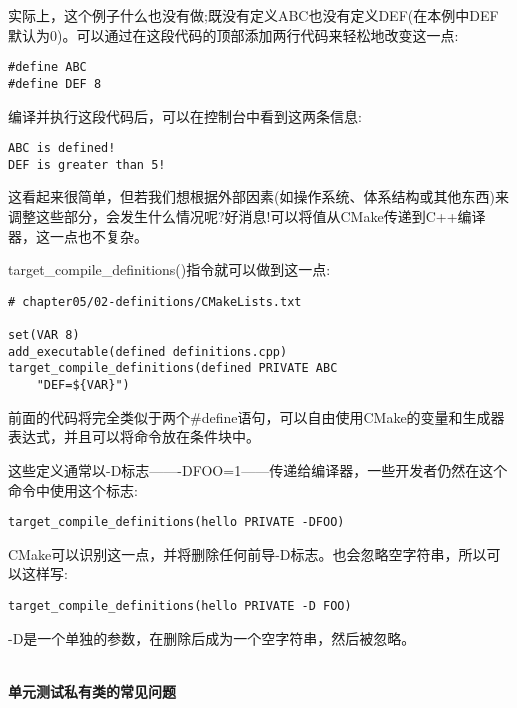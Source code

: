 实际上，这个例子什么也没有做;既没有定义ABC也没有定义DEF(在本例中DEF默认为0)。可以通过在这段代码的顶部添加两行代码来轻松地改变这一点:

\begin{lstlisting}[style=styleCXX]
#define ABC
#define DEF 8
\end{lstlisting}

编译并执行这段代码后，可以在控制台中看到这两条信息:

\begin{lstlisting}[style=styleCXX]
ABC is defined!
DEF is greater than 5!
\end{lstlisting}

这看起来很简单，但若我们想根据外部因素(如操作系统、体系结构或其他东西)来调整这些部分，会发生什么情况呢?好消息!可以将值从CMake传递到C++编译器，这一点也不复杂。

target\_compile\_definitions()指令就可以做到这一点:

\begin{lstlisting}[style=styleCMake]
# chapter05/02-definitions/CMakeLists.txt

set(VAR 8)
add_executable(defined definitions.cpp)
target_compile_definitions(defined PRIVATE ABC
	"DEF=${VAR}")
\end{lstlisting}

前面的代码将完全类似于两个\#define语句，可以自由使用CMake的变量和生成器表达式，并且可以将命令放在条件块中。

\begin{tcolorbox}[colback=blue!5!white,colframe=blue!75!black,title=重要的Note]
这些定义通常以-D标志——-DFOO=1——传递给编译器，一些开发者仍然在这个命令中使用这个标志:

\begin{lstlisting}[style=styleCMake]
target_compile_definitions(hello PRIVATE -DFOO)
\end{lstlisting}  

CMake可以识别这一点，并将删除任何前导-D标志。也会忽略空字符串，所以可以这样写:

\begin{lstlisting}[style=styleCMake]
target_compile_definitions(hello PRIVATE -D FOO)
\end{lstlisting}   

-D是一个单独的参数，在删除后成为一个空字符串，然后被忽略。
\end{tcolorbox}

\hspace*{\fill} \\ %
\noindent
\textbf{单元测试私有类的常见问题}

